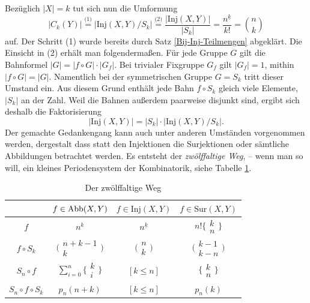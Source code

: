 \noindent
Bezüglich $|X|=k$ tut sich nun die Umformung
\[|C_k(Y)| \stackrel{\text{(1)}}= |\mathrm{Inj}(X,Y)/S_k|
\stackrel{\text{(2)}}= \frac{|\mathrm{Inj}(X,Y)|}{|S_k|} =
\frac{n^{\underline k}}{k!} = \binom{n}{k}\]
auf. Der Schritt (1) wurde bereits durch Satz
\ref{Bij-Inj-Teilmengen} abgeklärt. Die Einsicht in (2) erhält man
folgendermaßen. Für jede Gruppe $G$ gilt die Bahnformel
$|G| = |f\circ G|\cdot |G_f|$. Bei trivialer Fixgruppe $G_f$ gilt
$|G_f| = 1$, mithin $|f\circ G| = |G|$. Namentlich bei der symmetrischen
Gruppe $G=S_k$ tritt dieser Umstand ein. Aus diesem Grund enthält jede
Bahn $f\circ S_k$ gleich viele Elemente, $|S_k|$ an der Zahl. Weil
die Bahnen außerdem paarweise disjunkt sind, ergibt sich deshalb
die Faktorisierung
\[|\mathrm{Inj}(X,Y)| = |S_k|\cdot |\mathrm{Inj}(X,Y)/S_k|.\]
Der gemachte Gedankengang kann auch unter anderen Umständen vorgenommen
werden, dergestalt dass statt den Injektionen die Surjektionen oder sämtliche
Abbildungen betrachtet werden. Es entsteht der \emph{zwölffaltige Weg},
-- wenn man so will, ein kleines Periodensystem der Kombinatorik, 
siehe Tabelle \ref{tab:twelvefold-way}. \cite{Stanley}

\begin{table}
\begin{center}
\caption{Der zwölffaltige Weg}
\label{tab:twelvefold-way}
\begin{tabular}{c|ccc}
\toprule
& $f\in\operatorname{Abb}(X,Y)$ & $f\in\mathrm{Inj}(X,Y)$ & $f\in\mathrm{Sur}(X,Y)$\\
\midrule[\heavyrulewidth]
$f$ & $n^k$ & $n^{\underline k}$ & $n!\big\{\!\begin{smallmatrix}k\\ n\end{smallmatrix}\!\big\}$\\[4pt]
$f\circ S_k$ & $\big(\!\begin{smallmatrix}n+k-1\\ k\end{smallmatrix}\!\big)$
& $\big(\!\begin{smallmatrix}n\\ k\end{smallmatrix}\!\big)$
& $\big(\!\begin{smallmatrix}k-1\\ k-n\end{smallmatrix}\!\big)$\\[4pt]
$S_n\circ f$ & $\sum_{i=0}^n \big\{\!\begin{smallmatrix}k\\ i\end{smallmatrix}\!\big\}$
& $[k\le n]$ & $\big\{\!\begin{smallmatrix}k\\ n\end{smallmatrix}\!\big\}$\\[4pt]
$S_n\circ f\circ S_k$ & $p_n(n+k)$ & $[k\le n]$ & $p_n(k)$\\
\bottomrule
\end{tabular}
\end{center}
\end{table}

